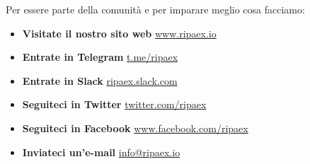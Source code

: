\documentclass[11pt,fleqn]{book} %
\begin{document}
Per essere parte della comunità e per imparare meglio cosa facciamo:
\begin{itemize}
	\item \textbf{Visitate il nostro sito web} \href{https://www.ripaex.io}{\faHome \hspace{0.2cm} www.ripaex.io} 
	\item \textbf{Entrate in Telegram} \href{https://t.me/ripaex}{\faSend \hspace{0.2cm} t.me/ripaex}
	\item \textbf{Entrate in Slack} \href{https://join.slack.com/t/ripaex/shared_invite/enQtMzM4NzUwNjU4OTQ0LTY3MDJmMTdhYTNlZjJlNGUxNzM1YjUwYjgyYjZlMDJmOTg3NTIzNThmNTYyMGQ3ODBkOTRmYzk3Y2Y4MzBkOTY}{\faSlack \hspace{0.2cm} ripaex.slack.com}
	\item \textbf{Seguiteci in Twitter} \href{https://twitter.com/ripaex}{\faTwitter \hspace{0.2cm} twitter.com/ripaex}
	\item \textbf{Seguiteci in Facebook} \href{https://www.facebook.com/ripaex}{\faFacebook \hspace{0.2cm} www.facebook.com/ripaex}
	\item \textbf{Inviateci un'e-mail} \href{mailto:info@ripaex.io}{\faInternetExplorer \hspace{0.2cm} info@ripaex.io}
\end{itemize}

\end{document}
